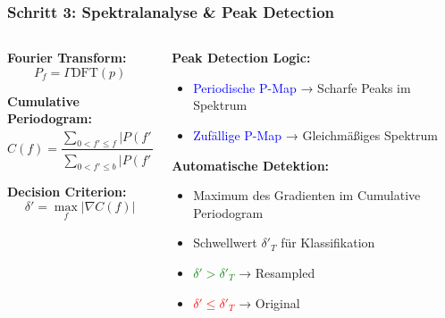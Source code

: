 \documentclass[11pt,t,usepdftitle=false,aspectratio=169]{beamer}
\begin{document}
\begin{frame}
	\frametitle{Schritt 3: Spektralanalyse \& Peak Detection}
	
	\begin{columns}[T]
		\begin{column}{0.45\textwidth}
			\textbf{Fourier Transform:}
			$$P_f = \Gamma\text{DFT}(p)$$
			
			\vspace{0.5em}
			\textbf{Cumulative Periodogram:}
			$$C(f) = \frac{\sum_{0<f' \leq f} |P(f')|^2}{\sum_{0<f' \leq b} |P(f')|^2}$$
			
			\vspace{0.5em}
			\textbf{Decision Criterion:}
			$$\delta' = \max_f |\nabla C(f)|$$
		\end{column}
		\begin{column}{0.5\textwidth}
			\textbf{Peak Detection Logic:}
			\begin{itemize}
				\item \textcolor{blue}{Periodische P-Map} → Scharfe Peaks im Spektrum
				\item \textcolor{blue}{Zufällige P-Map} → Gleichmäßiges Spektrum
			\end{itemize}
			
			\vspace{0.5em}
			\textbf{Automatische Detektion:}
			\begin{itemize}
				\item Maximum des Gradienten im Cumulative Periodogram
				\item Schwellwert $\delta'_T$ für Klassifikation
				\item \textcolor{green}{$\delta' > \delta'_T$} → Resampled
				\item \textcolor{red}{$\delta' \leq \delta'_T$} → Original
			\end{itemize}
		\end{column}
	\end{columns}
\end{frame}
\end{document}
